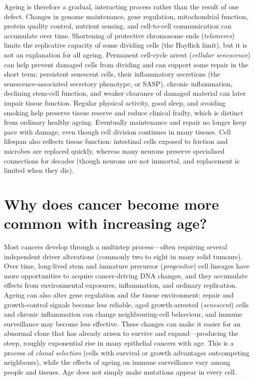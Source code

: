 \documentclass[11pt,oneside]{report}
\begin{document}
Ageing is therefore a gradual, interacting process rather than the result of
one defect. Changes in genome maintenance, gene regulation, mitochondrial
function, protein quality control, nutrient sensing, and cell-to-cell
communication can accumulate over time. Shortening of protective chromosome ends
(\emph{telomeres}) limits the replicative capacity of some dividing cells (the
Hayflick limit), but it is not an explanation for all ageing. Permanent
cell-cycle arrest (\emph{cellular senescence}) can help prevent damaged cells
from dividing and can support some repair in the short term; persistent
senescent cells, their inflammatory secretions (the senescence-associated
secretory phenotype, or SASP), chronic inflammation, declining stem-cell
function, and weaker clearance of damaged material can later impair tissue
function. Regular physical activity, good sleep, and avoiding smoking help
preserve tissue reserve and reduce clinical frailty, which is distinct from
ordinary healthy ageing. Eventually maintenance and repair no longer keep pace with damage, even though
cell division continues in many tissues. Cell lifespan also reflects tissue
function: intestinal cells exposed to friction and microbes are replaced
quickly, whereas many neurons preserve specialised connections for decades
(though neurons are not immortal, and replacement is limited when they die).

\section{Why does cancer become more common with increasing age?}

Most cancers develop through a multistep process—often requiring several
independent driver alterations (commonly two to eight in many solid tumours).
Over time, long-lived stem and immature precursor (\emph{progenitor}) cell
lineages have more opportunities to acquire cancer-driving DNA changes, and they
accumulate effects from environmental exposures, inflammation, and ordinary
replication. Ageing can also alter gene regulation and the tissue environment:
repair and growth-control signals become less reliable, aged growth-arrested
(\emph{senescent}) cells and chronic inflammation can change neighbouring-cell
behaviour, and immune surveillance may become less effective. These changes
can make it easier for an abnormal clone that has already arisen to survive and
expand—producing the steep, roughly exponential rise in many epithelial cancers
with age. This is a process of \emph{clonal selection} (cells with survival or
growth advantages outcompeting neighbours), while the effects of ageing on
immune surveillance vary among people and tissues. Age does not simply make mutations
appear in every cell.
\end{document}
